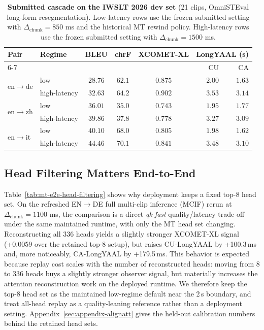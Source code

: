 \documentclass[11pt]{article}
\begin{document}
\begin{table}[t]
\centering
\small
\setlength{\tabcolsep}{3.5pt}
\begin{tabular}{l l c c c r r}
\toprule
Pair & Regime & BLEU & chrF & XCOMET-XL & \multicolumn{2}{c}{LongYAAL (s)} \\
\cmidrule(lr){6-7}
& & & & & CU & CA \\
\midrule
\multirow{2}{*}{en$\to$de} & low     & $28.76$ & $62.1$ & $0.875$ & $2.00$ & $1.63$ \\
                           & high-latency & $32.63$ & $64.2$ & $0.902$ & $3.53$ & $3.14$ \\
\midrule
\multirow{2}{*}{en$\to$zh} & low     & $36.01$ & $35.0$ & $0.743$ & $1.95$ & $1.77$ \\
                           & high-latency & $39.86$ & $37.8$ & $0.778$ & $3.27$ & $3.09$ \\
\midrule
\multirow{2}{*}{en$\to$it} & low     & $40.10$ & $68.0$ & $0.805$ & $1.98$ & $1.62$ \\
                           & high-latency & $44.46$ & $70.1$ & $0.841$ & $3.48$ & $3.10$ \\
\bottomrule
\end{tabular}
\caption{\textbf{Submitted cascade on the IWSLT 2026 dev set}
(21 clips, OmniSTEval long-form resegmentation). Low-latency rows use the
frozen submitted setting with $\Delta_{\mathrm{chunk}}=850$ ms and the
historical MT rewind policy. High-latency rows use the frozen submitted
setting with $\Delta_{\mathrm{chunk}}=1500$ ms.}
\label{tab:e2e}
\end{table}



\subsection{Head Filtering Matters End-to-End}
\label{sec:head-filtering}

Table~\ref{tab:mt-e2e-head-filtering} shows why deployment keeps a fixed top-8
head set. On the refreshed EN$\to$DE full multi-clip inference (MCIF) rerun at
$\Delta_{\mathrm{chunk}}=1100$ ms, the comparison is a direct \emph{qk-fast}
quality/latency trade-off under the same maintained runtime, with only the MT
head set changing. Reconstructing all 336 heads yields a slightly stronger
XCOMET-XL signal (+0.0059 over the retained top-8 setup), but raises
CU-LongYAAL by +100.3\,ms and, more noticeably, CA-LongYAAL by +179.5\,ms.
This behavior is expected because replay cost scales with the number of
reconstructed heads: moving from 8 to 336 heads buys a slightly stronger
observer signal, but materially increases the attention reconstruction work on
the deployed runtime. We therefore keep the top-8 head set as the maintained
low-regime default near the 2\,s boundary, and treat all-head replay as a
quality-leaning reference rather than a deployment setting.
Appendix~\ref{sec:appendix-alignatt} gives the held-out calibration numbers
behind the retained head sets.
\end{document}
